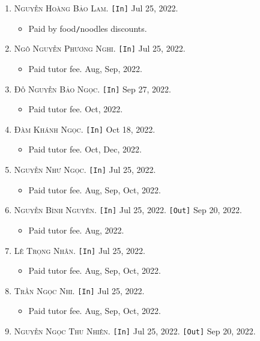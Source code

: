 \documentclass{article}
\numberwithin{equation}{section}
\begin{document}
\begin{enumerate}
	\item \textsc{Nguyễn Hoàng Bảo Lam.} \texttt{[In]} Jul 25, 2022.
	\begin{itemize}
		\item \textsf{Paid by food\texttt{/}noodles discounts.}
	\end{itemize}
	\item \textsc{Ngô Nguyễn Phương Nghi.} \texttt{[In]} Jul 25, 2022.
	\begin{itemize}
		\item \textsf{Paid tutor fee.} Aug, Sep, 2022.
	\end{itemize}
	\item \textsc{Đỗ Nguyễn Bảo Ngọc.} \texttt{[In]} Sep 27, 2022.
	\begin{itemize}
		\item \textsf{Paid tutor fee.} Oct, 2022.
	\end{itemize}
	\item \textsc{Đàm Khánh Ngọc.} \texttt{[In]} Oct 18, 2022.
	\begin{itemize}
		\item \textsf{Paid tutor fee.} Oct, Dec, 2022.
	\end{itemize}
	\item \textsc{Nguyễn Như Ngọc.} \texttt{[In]} Jul 25, 2022.
	\begin{itemize}
		\item \textsf{Paid tutor fee.} Aug, Sep, Oct, 2022.
	\end{itemize}
	\item \textsc{Nguyễn Bình Nguyên.} \texttt{[In]} Jul 25, 2022. \texttt{[Out]} Sep 20, 2022.
	\begin{itemize}
		\item \textsf{Paid tutor fee.} Aug, 2022.
	\end{itemize}
	\item \textsc{Lê Trọng Nhân.} \texttt{[In]} Jul 25, 2022.
	\begin{itemize}
		\item \textsf{Paid tutor fee.} Aug, Sep, Oct, 2022.
	\end{itemize}
	\item \textsc{Trần Ngọc Nhi.} \texttt{[In]} Jul 25, 2022.
	\begin{itemize}
		\item \textsf{Paid tutor fee.} Aug, Sep, Oct, 2022.
	\end{itemize}
	\item \textsc{Nguyễn Ngọc Thu Nhiên.} \texttt{[In]} Jul 25, 2022. \texttt{[Out]} Sep 20, 2022.

\end{enumerate}
\end{document}
